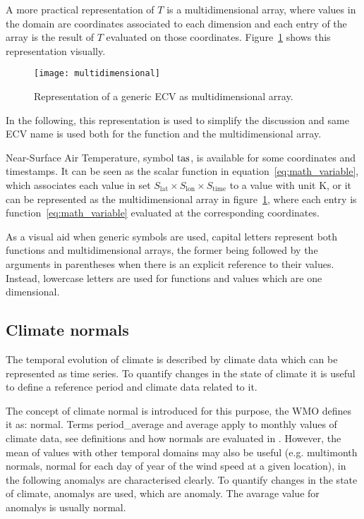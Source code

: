 A more practical representation of $T$ is a multidimensional array, where values in the domain are coordinates associated to each dimension and each entry of the array is the result of $T$ evaluated on those coordinates. Figure~\ref{fig:multidimensional} shows this representation visually.
\begin{figure}[h]
  \centering
  \texttt{[image: multidimensional]}
  \caption{Representation of a generic \gls{ECV} as multidimensional array.}
  \label{fig:multidimensional}
\end{figure}
In the following, this representation is used to simplify the discussion and same \gls{ECV} name is used both for the function and the multidimensional array.
\begin{example}
  Near-Surface Air Temperature, symbol $\mathrm{tas}$, is available for some coordinates and timestamps. It can be seen as the scalar function in equation~\eqref{eq:math_variable}, which associates each value in set $S_\text{lat} \times S_\text{lon} \times S_\text{time}$ to a value with unit \unit{\kelvin}, or it can be represented as the multidimensional array in figure~\ref{fig:multidimensional}, where each entry is function~\eqref{eq:math_variable} evaluated at the corresponding coordinates.
\end{example}

As a visual aid when generic symbols are used, capital letters represent both functions and multidimensional arrays, the former being followed by the arguments in parentheses when there is an explicit reference to their values. Instead, lowercase letters are used for functions and values which are one dimensional.

\subsection{Climate normals}
The temporal evolution of climate is described by climate data which can be represented as time series. To quantify changes in the state of climate it is useful to define a reference period and climate data related to it.

The concept of climate \gls{normal} is introduced for this purpose, the \gls{WMO} defines it as: \glsdesc{normal}. Terms \Gls{period_average} and \gls{average} apply to monthly values of climate data, see definitions and how \glspl{normal} are evaluated in \cite[5-6]{2017WorldMeteorologicalOrganizationWMOWMOGuidelines}. However, the mean of values with other temporal domains may also be useful (e.g. multimonth \glspl{normal}, normal for each day of year of the wind speed at a given location), in the following \glspl{anomaly} are characterised clearly.
To quantify changes in the state of climate, \glspl{anomaly} are used, which are \glsdesc{anomaly}. The avarage value for \glspl{anomaly} is usually \gls{normal}.

